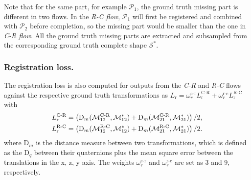 Note that for the same part, for example $\mathcal{P}_1$, the ground truth missing part is different in two flows. In the \textit{R-C flow}, $\mathcal{P}_1$ will first be registered and combined with $\mathcal{P}_2$ before completion, so the missing part would be smaller than the one in \textit{C-R flow}. All the ground truth missing parts are extracted and subsampled from the corresponding ground truth complete shape $\mathcal{S}^*$.

\subsubsection{Registration loss.}
The registration loss is also computed for outputs from the \textit{C-R} and \textit{R-C} flows against the respective ground truth transformations as $L_{\text{r}} = \omega_r^{\text{c-r}}L_{\text{r}}^{\text{C-R}} + \omega_r^{\text{r-c}}L_{\text{r}}^{\text{R-C}}$ with 
\begin{align}
L_{\text{r}}^{\text{C-R}} &= \left(\text{D}_m(\mathcal{M}_{12}^{\text{C-R}}, \mathcal{M}_{12}^{*}) + \text{D}_m(\mathcal{M}_{21}^{\text{C-R}}, \mathcal{M}_{21}^{* })\right) / 2,
\notag \\ 
L_{\text{r}}^{\text{R-C}} &= \left(\text{D}_m(\mathcal{M}_{12}^{\text{R-C}}, \mathcal{M}_{12}^{*}) + \text{D}_m(\mathcal{M}_{21}^{\text{R-C}}, \mathcal{M}_{21}^{*})\right) / 2.
\end{align}
where $\text{D}_m$ is the distance measure between two transformations, which is defined as the $\text{D}_q$ between their quaternions plus the mean square error between the translations in the x, z, y axis. The weights $\omega_r^{\text{c-r}}$ and $\omega_r^{\text{r-c}}$ are set as 3 and 9, respectively.


